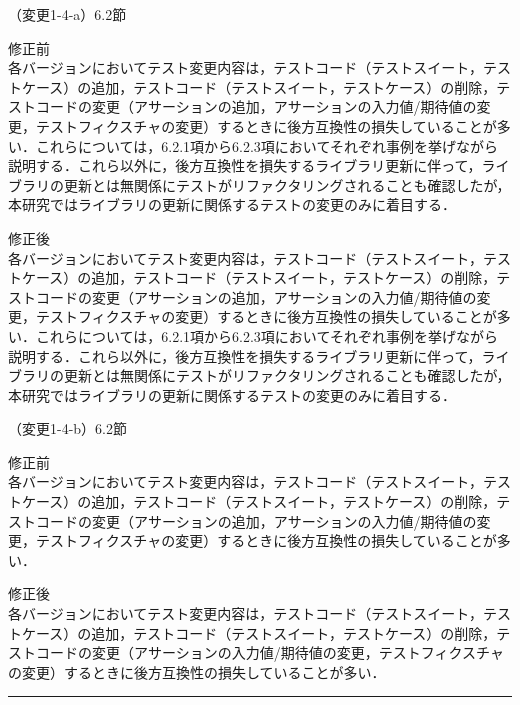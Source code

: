 \documentclass{jarticle} %
\def\subsection#1{ \vspace{1pc} {\gt #1} }
\def\nextans{ \vspace{2pc} \hrule }
\begin{document}
\subsection{（変更1-4-a）6.2節}
\vspace{-0.3cm}
\begin{description}
\item 修正前\\
\phantom{　}
各バージョンにおいてテスト変更内容は，テストコード（テストスイート，テストケース）の追加，テストコード（テストスイート，テストケース）の削除，テストコードの変更（アサーションの追加，アサーションの入力値/期待値の変更，テストフィクスチャの変更）するときに後方互換性の損失していることが多い．これらについては，6.2.1項から6.2.3項においてそれぞれ事例を挙げながら説明する．これら以外に，後方互換性を損失するライブラリ更新に伴って，ライブラリの更新とは無関係にテストがリファクタリングされることも確認したが，本研究ではライブラリの更新に関係するテストの変更のみに着目する．
\vspace{-0.3cm}
\item 修正後\\
\phantom{　}
各バージョンにおいてテスト変更内容は，テストコード（テストスイート，テストケース）の追加，テストコード（テストスイート，テストケース）の削除，テストコードの変更（アサーションの追加，アサーションの入力値/期待値の変更，テストフィクスチャの変更）するときに後方互換性の損失していることが多い．これらについては，6.2.1項から6.2.3項においてそれぞれ事例を挙げながら説明する．\textcolor{red}{}これら以外に，後方互換性を損失するライブラリ更新に伴って，ライブラリの更新とは無関係にテストがリファクタリングされることも確認したが，本研究ではライブラリの更新に関係するテストの変更のみに着目する．
\end{description}

\subsection{（変更1-4-b）6.2節}
\vspace{-0.3cm}
\begin{description}
\item 修正前\\
\phantom{　}
各バージョンにおいてテスト変更内容は，テストコード（テストスイート，テストケース）の追加，テストコード（テストスイート，テストケース）の削除，テストコードの変更（アサーションの追加，アサーションの入力値/期待値の変更，テストフィクスチャの変更）するときに後方互換性の損失していることが多い．
\vspace{-0.3cm}
\item 修正後\\
\phantom{　}
各バージョンにおいてテスト変更内容は，テストコード（テストスイート，テストケース\textcolor{red}{}）の追加，テストコード（テストスイート，テストケース）の削除，テストコードの変更（アサーションの入力値/期待値の変更，テストフィクスチャの変更）するときに後方互換性の損失していることが多い．
\end{description}
\newpage
\nextans
\end{document}
